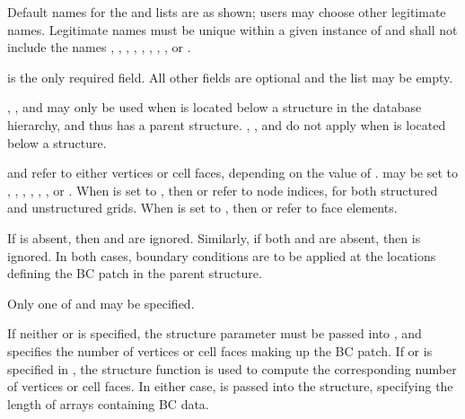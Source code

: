 \begin{notes}
\item Default names for the  and
       lists are as shown; users may choose other
      legitimate names.
      Legitimate names must be unique within a given instance
      of  and shall not include the names
      ,
      , , ,
      , , ,
      , or .
\item {} is the only required field.
      All other fields are optional and the  list
      may be empty.
\item {}, , and 
      may only be used when  is located below a
       structure in the database hierarchy, and thus has a
      parent  structure.
      , , and 
      do not apply when  is located below a
       structure.
\item {} and  refer to either vertices or
      cell faces, depending on the value of .
       may be set to ,
      , , ,
      , , or .
      When  is set to , then
       or  refer to node indices, for
      both structured and unstructured grids.
      When  is set to , then
       or  refer to face elements.
\item If  is absent, then  and
       are ignored.
      Similarly, if both  and  are
      absent, then  is ignored.
      In both cases, boundary conditions are to be applied at the
      locations defining the BC patch in the parent 
      structure.
\item Only one of  and  may be
      specified.
\end{notes}

If neither  or  is specified,
the structure parameter  must be passed into
, and specifies the number of vertices or cell faces
making up the BC patch.
If  or  is specified in
, the structure function  is used to
compute the corresponding number of vertices or cell faces.
In either case,  is passed into the 
structure, specifying the length of arrays containing BC data.

